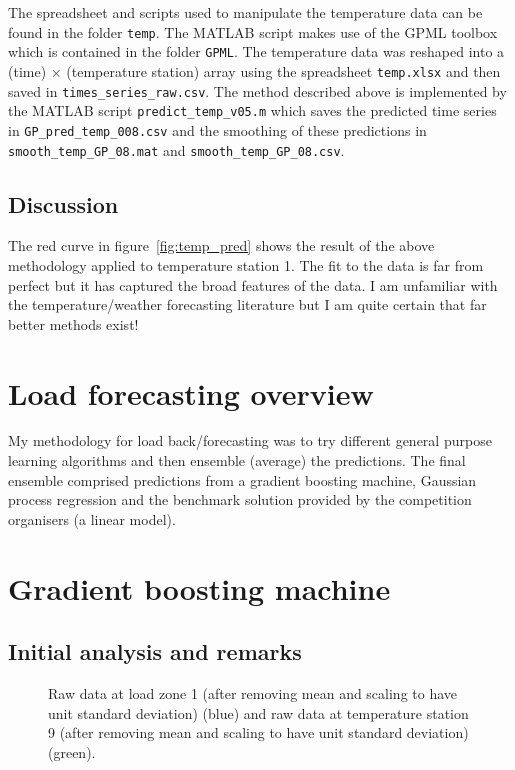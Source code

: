 \documentclass[preprint,authoryear,12pt]{elsarticle}
\begin{document}
The spreadsheet and scripts used to manipulate the temperature data can be found in the folder \texttt{temp}.
The MATLAB script makes use of the GPML toolbox which is contained in the folder \texttt{GPML}.
The temperature data was reshaped into a (time) $\times$ (temperature station) array using the spreadsheet \texttt{temp.xlsx} and then saved in \texttt{times\_series\_raw.csv}.
The method described above is implemented by the MATLAB script \texttt{predict\_temp\_v05.m} which saves the predicted time series in \texttt{GP\_pred\_temp\_008.csv} and the smoothing of these predictions in \texttt{smooth\_temp\_GP\_08.mat} and \texttt{smooth\_temp\_GP\_08.csv}.

\subsection{Discussion}

The red curve in figure~\ref{fig:temp_pred} shows the result of the above methodology applied to temperature station 1.
The fit to the data is far from perfect but it has captured the broad features of the data.
I am unfamiliar with the temperature/weather forecasting literature but I am quite certain that far better methods exist!

\section{Load forecasting overview}

My methodology for load back/forecasting was to try different general purpose learning algorithms and then ensemble (average) the predictions.
The final ensemble comprised predictions from a gradient boosting machine, Gaussian process regression and the benchmark solution provided by the competition organisers (a linear model).

\section{Gradient boosting machine}

\subsection{Initial analysis and remarks}

\label{sec:gbm_init_anal}

\begin{figure}[ht]
  \begin{center}
    
  \end{center}
  \caption{Raw data at load zone 1 (after removing mean and scaling to have unit standard deviation) (blue) and raw data at temperature station 9 (after removing mean and scaling to have unit standard deviation) (green).}
  \label{fig:load_temp}
\end{figure}
\end{document}
